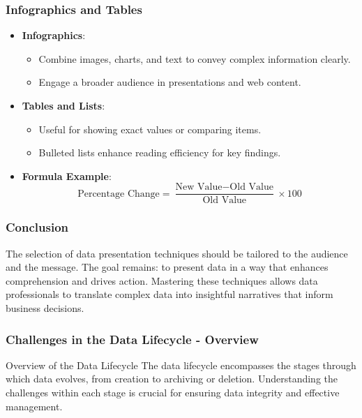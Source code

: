 \documentclass[aspectratio=169]{beamer}
\begin{document}
\begin{frame}[fragile]
    \frametitle{Infographics and Tables}
    \begin{itemize}
        \item \textbf{Infographics}:
        \begin{itemize}
            \item Combine images, charts, and text to convey complex information clearly.
            \item Engage a broader audience in presentations and web content.
        \end{itemize}
        \item \textbf{Tables and Lists}:
        \begin{itemize}
            \item Useful for showing exact values or comparing items.
            \item Bulleted lists enhance reading efficiency for key findings.
        \end{itemize}
        \item \textbf{Formula Example}:
        \begin{equation}
            \text{Percentage Change} = \frac{\text{New Value} - \text{Old Value}}{\text{Old Value}} \times 100
        \end{equation}
    \end{itemize}
\end{frame}

\begin{frame}[fragile]
    \frametitle{Conclusion}
    The selection of data presentation techniques should be tailored to the audience and the message. The goal remains: to present data in a way that enhances comprehension and drives action. Mastering these techniques allows data professionals to translate complex data into insightful narratives that inform business decisions.
\end{frame}

\begin{frame}[fragile]
  \frametitle{Challenges in the Data Lifecycle - Overview}
  
  \begin{block}{Overview of the Data Lifecycle}
    The data lifecycle encompasses the stages through which data evolves, from creation to archiving or deletion. Understanding the challenges within each stage is crucial for ensuring data integrity and effective management.
  \end{block}
  
\end{frame}
\end{document}
